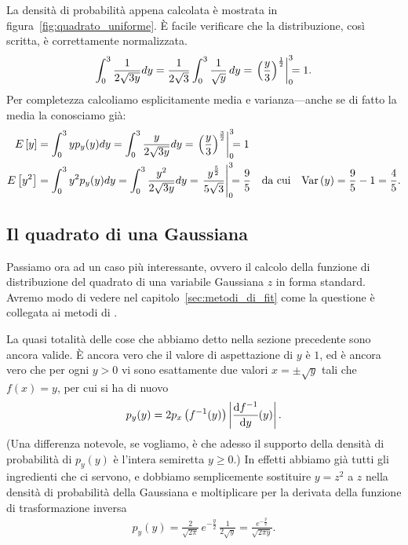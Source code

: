 
La densità di probabilità appena calcolata è mostrata in
figura~\ref{fig:quadrato_uniforme}. \`E facile verificare che la distribuzione,
così scritta, è correttamente normalizzata.
\begin{align*}
  \int_0^3 \frac{1}{2\sqrt{3y}} dy =
  \frac{1}{2\sqrt{3}} \int_0^3 \frac{1}{\sqrt{y}} \, dy =
  \eval{\left( \frac{y}{3} \right)^\frac{1}{2}}{0}{3} = 1.
\end{align*}
Per completezza calcoliamo esplicitamente media e varianza---anche se di fatto
la media la conosciamo già:
\begin{align}
  \expect{y} & = \int_0^3 yp_y(y) dy =
  \int_0^3 \frac{y}{2\sqrt{3y}} dy =
  \eval{\left(\frac{y}{3}\right)^{\frac{3}{2}}}{0}{3} = 1 \\
  \expect{y^2} & = \int_0^3 y^2p_y(y) dy =
  \int_0^3 \frac{y^2}{2\sqrt{3y}} dy =
  \eval{\frac{y^\frac{5}{2}}{5\sqrt{3}}}{0}{3} = \frac{9}{5}
  \quad \text{da cui} \quad \var{y} = \frac{9}{5} - 1 = \frac{4}{5}.
\end{align}


\subsection{Il quadrato di una Gaussiana}
\label{sec:pdf_quadrato_gaussiana}

Passiamo ora ad un caso più interessante, ovvero il calcolo della funzione
di distribuzione del quadrato di una variabile Gaussiana $z$ in forma standard.
Avremo modo di vedere nel capitolo~\ref{sec:metodi_di_fit} come la questione
è collegata ai metodi di \fit.

La quasi totalità delle cose che abbiamo detto nella sezione precedente
sono ancora valide. \`E ancora vero che il valore di aspettazione di $y$ è
$1$, ed è ancora vero che per ogni $y > 0$ vi sono esattamente due valori
$x = \pm \sqrt{y}$ tali che $f(x) = y$, per cui si ha di nuovo
\begin{align*}
  p_y(y) = 2 p_x\left(f^{-1}(y)\right)\abs{\td{f^{-1}}{y}{y}}.
\end{align*}
(Una differenza notevole, se vogliamo, è che adesso il supporto della
densità di probabilità di $p_y(y)$ è l'intera semiretta $y \geq 0$.)
In effetti abbiamo già tutti gli ingredienti che ci servono, e dobbiamo
semplicemente sostituire $y = z^2$ a $z$ nella densità di probabilità della
Gaussiana e moltiplicare per la derivata della funzione di trasformazione
inversa
\begin{align}\label{eq:pdf_quadrato_gauss}
  p_y(y) = \frac{2}{\sqrt{2\pi}}\, e^{-\frac{y}{2}} \, \frac{1}{2\sqrt{y}} =
  \frac{e^{-\frac{y}{2}}}{\sqrt{2\pi y}}.
\end{align}

